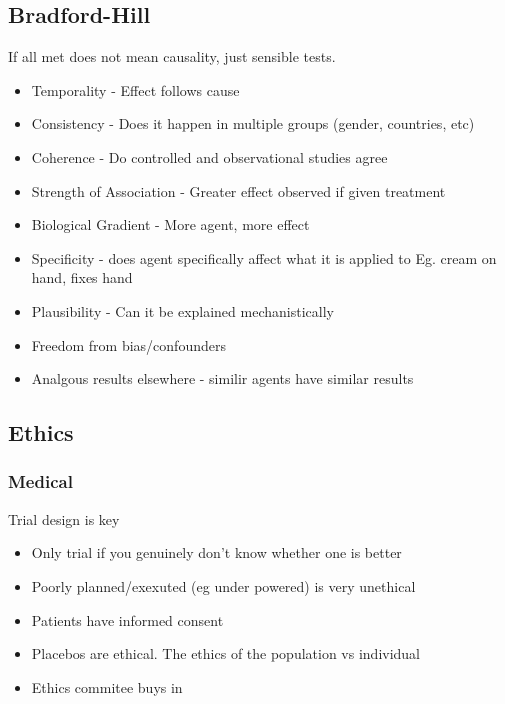 \documentclass[
  letterpaper,
  DIV=11,
  numbers=noendperiod]{scrreprt}
\providecommand{\tightlist}{%
  \setlength{\itemsep}{0pt}\setlength{\parskip}{0pt}}\usepackage{longtable,booktabs,array}
\begin{document}
\hypertarget{bradford-hill}{%
\subsection{Bradford-Hill}\label{bradford-hill}}

If all met does not mean causality, just sensible tests.

\begin{itemize}
\tightlist
\item
  Temporality - Effect follows cause
\item
  Consistency - Does it happen in multiple groups (gender, countries,
  etc)
\item
  Coherence - Do controlled and observational studies agree
\item
  Strength of Association - Greater effect observed if given treatment
\item
  Biological Gradient - More agent, more effect
\item
  Specificity - does agent specifically affect what it is applied to Eg.
  cream on hand, fixes hand
\item
  Plausibility - Can it be explained mechanistically
\item
  Freedom from bias/confounders
\item
  Analgous results elsewhere - similir agents have similar results
\end{itemize}

\hypertarget{ethics}{%
\subsection{Ethics}\label{ethics}}

\hypertarget{medical}{%
\subsubsection{Medical}\label{medical}}

Trial design is key

\begin{itemize}
\tightlist
\item
  Only trial if you genuinely don't know whether one is better
\item
  Poorly planned/exexuted (eg under powered) is very unethical
\item
  Patients have informed consent
\item
  Placebos are ethical. The ethics of the population vs individual
\item
  Ethics commitee buys in
\end{itemize}
\end{document}
